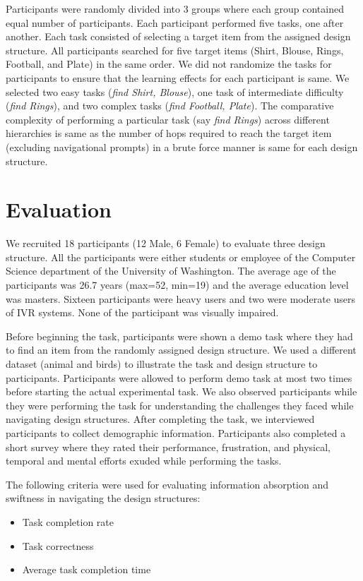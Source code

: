 \documentclass{sigchi}
\begin{document}
Participants were randomly divided into 3 groups where each group contained equal number of participants. Each participant performed five tasks, one after another. Each task consisted of selecting a target item from the assigned design structure. All participants searched for five target items (Shirt, Blouse, Rings, Football, and Plate) in the same order. We did not randomize the tasks for participants to ensure that the learning effects for each participant is same. We selected two easy tasks (\textit{find Shirt, Blouse}), one task of intermediate difficulty (\textit{find Rings}), and two complex tasks (\textit{find Football, Plate}). The comparative complexity of performing a particular task (say \textit{find Rings}) across different hierarchies is same as the number of hops required to reach the target item (excluding navigational prompts) in a brute force manner is same for each design structure.  

\section{Evaluation}
We recruited 18 participants (12 Male, 6 Female) to evaluate three design structure. All the participants were either students or employee of the Computer Science department of the University of Washington. The average age of the participants was 26.7 years (max=52, min=19) and the average education level was masters. Sixteen participants were heavy users and two were moderate users of IVR systems. None of the participant was visually impaired. 

Before beginning the task, participants were shown a demo task where they had to find an item from the randomly assigned design structure. We used a different dataset (animal and birds) to illustrate the task and design structure to participants. Participants were allowed to perform demo task at most two times before starting the actual experimental task. We also observed participants while they were performing the task for understanding the challenges they faced while navigating design structures. After completing the task, we interviewed participants to collect demographic information. Participants also completed a short survey where they rated their performance, frustration, and physical, temporal and mental efforts exuded while performing the tasks. 

The following criteria were used for evaluating information absorption and swiftness in navigating the design structures:
\begin{itemize}
\item Task completion rate
\item Task correctness
\item Average task completion time
\end{itemize}
\end{document}

